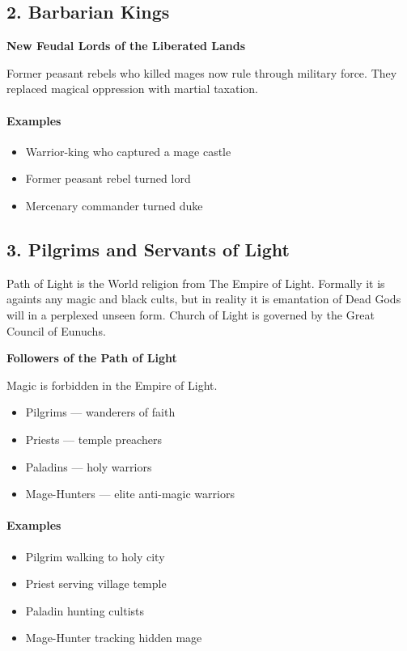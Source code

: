 \documentclass[a4paper,12pt]{article}
\begin{document}
\subsection{2. Barbarian Kings}

\textbf{New Feudal Lords of the Liberated Lands}

Former peasant rebels who killed mages now rule through military force. They replaced magical oppression with martial taxation.

\paragraph{Examples}
\begin{itemize}
\item Warrior-king who captured a mage castle
\item Former peasant rebel turned lord
\item Mercenary commander turned duke
\end{itemize}



\subsection{3. Pilgrims and Servants of Light}

Path of Light is the World religion from The Empire of Light. Formally it is againts any magic and black cults, but in reality it is emantation of Dead Gods will in a perplexed unseen form. Church of Light is governed by the Great Council of Eunuchs.

\textbf{Followers of the Path of Light}

Magic is forbidden in the Empire of Light.

\begin{itemize}
\item Pilgrims — wanderers of faith
\item Priests — temple preachers
\item Paladins — holy warriors
\item Mage-Hunters — elite anti-magic warriors
\end{itemize}

\paragraph{Examples}
\begin{itemize}
\item Pilgrim walking to holy city
\item Priest serving village temple
\item Paladin hunting cultists
\item Mage-Hunter tracking hidden mage
\end{itemize}
\end{document}
